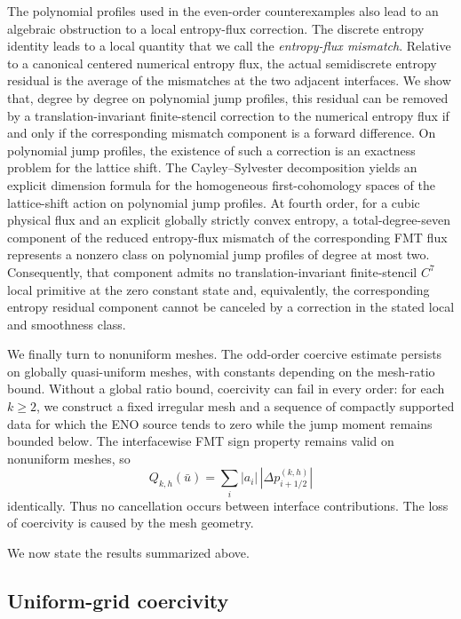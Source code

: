 \documentclass[11pt]{amsart}
\theoremstyle{plain}
\theoremstyle{definition}
\theoremstyle{remark}
\numberwithin{equation}{section}
\theoremstyle{plain}
\begin{document}
The polynomial profiles used in the even-order counterexamples also
lead to an algebraic obstruction to a local entropy-flux correction.  The
discrete entropy identity leads to a local quantity that we call the
\emph{entropy-flux mismatch}.
Relative to a canonical centered numerical entropy flux, the actual
semidiscrete entropy residual is the average of the mismatches at the two
adjacent interfaces.  We show 
that, degree by degree on polynomial jump profiles, this residual can be
removed by a translation-invariant finite-stencil correction to the numerical
entropy flux if and only if the corresponding mismatch component is a
forward difference.
On polynomial jump profiles, the existence of such a correction is an
exactness problem for the lattice shift.  The Cayley--Sylvester
decomposition \cite{CayleySecondQuantics} yields an explicit dimension formula for the
homogeneous first-cohomology spaces of the lattice-shift action on
polynomial jump profiles.  At fourth order, for a cubic physical flux and an explicit globally
strictly convex entropy, a total-degree-seven component of the
reduced entropy-flux mismatch of the corresponding FMT flux
represents a nonzero class on polynomial jump profiles of degree at
most two.  Consequently, that component admits no
translation-invariant finite-stencil $C^7$ local primitive at the
zero constant state and, equivalently, the corresponding entropy residual
component cannot be canceled by a correction in the stated local and
smoothness class.


We finally turn to nonuniform meshes.  The odd-order coercive estimate
persists on globally quasi-uniform meshes, with constants depending
on the mesh-ratio bound.  Without a global ratio bound, coercivity can
fail in every order: for each $k\ge2$, we construct a fixed irregular
mesh and a sequence of compactly supported data for which the ENO
source tends to zero while the jump moment remains bounded below.
The interfacewise FMT sign property remains valid on nonuniform
meshes, so
\[
Q_{k,h}(\bar u)
=
\sum_i |a_i|\,|\Delta p_{i+1/2}^{(k,h)}|
\]
identically.  Thus no cancellation occurs between interface
contributions.  The loss of coercivity is caused by the mesh
geometry.


We now state the results summarized above.


\subsection{Uniform-grid coercivity}\label{sec:intro-main-results}
\end{document}
